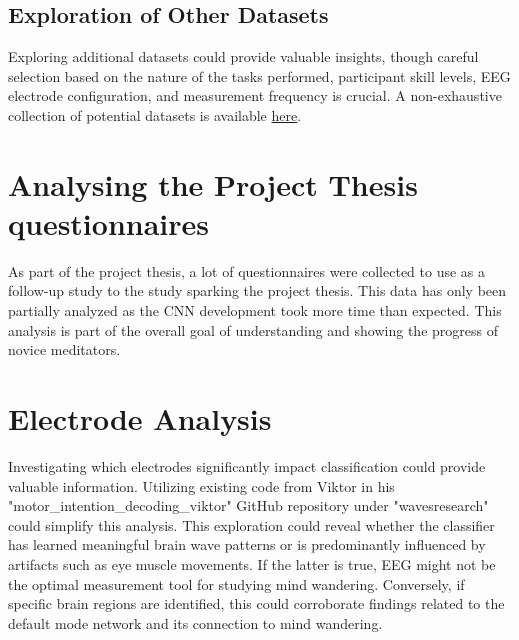 \subsection{Exploration of Other Datasets}
Exploring additional datasets could provide valuable insights, though careful selection based on the nature of the tasks performed, participant skill levels, EEG electrode configuration, and measurement frequency is crucial. A non-exhaustive collection of potential datasets is available \href{https://github.com/Pandey-Pankaj/ScienceOfMeditation/blob/main/datasets.md}{here}. 

\section{Analysing the Project Thesis questionnaires}
As part of the project thesis, a lot of questionnaires were collected to use as a follow-up study to the study sparking the project thesis. This data has only been partially analyzed as the CNN development took more time than expected. This analysis is part of the overall goal of understanding and showing the progress of novice meditators.  

\section{Electrode Analysis}
Investigating which electrodes significantly impact classification could provide valuable information. Utilizing existing code from Viktor in his  "motor\_intention\_decoding\_viktor" GitHub repository under "wavesresearch" could simplify this analysis. This exploration could reveal whether the classifier has learned meaningful brain wave patterns or is predominantly influenced by artifacts such as eye muscle movements. If the latter is true, EEG might not be the optimal measurement tool for studying mind wandering. Conversely, if specific brain regions are identified, this could corroborate findings related to the default mode network and its connection to mind wandering.

